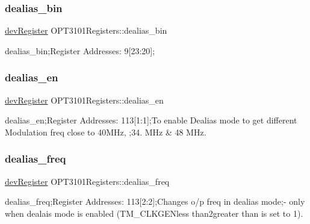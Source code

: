 \subsubsection{\texorpdfstring{dealias\+\_\+bin}{dealias\_bin}}
{\footnotesize\ttfamily \mbox{\hyperlink{classdev_register}{dev\+Register}} O\+P\+T3101\+Registers\+::dealias\+\_\+bin}



dealias\+\_\+bin;Register Addresses\+: 9\mbox{[}23\+:20\mbox{]}; 

\mbox{\label{class_o_p_t3101_registers_ac931eedf109f2f9401b66df4e3507a4b}} 
\subsubsection{\texorpdfstring{dealias\+\_\+en}{dealias\_en}}
{\footnotesize\ttfamily \mbox{\hyperlink{classdev_register}{dev\+Register}} O\+P\+T3101\+Registers\+::dealias\+\_\+en}



dealias\+\_\+en;Register Addresses\+: 113\mbox{[}1\+:1\mbox{]};To enable Dealias mode to get different Modulation freq close to 40\+M\+Hz, ;34. M\+Hz \& 48 M\+Hz. 

\mbox{\label{class_o_p_t3101_registers_a06fbd3557236e1c0b91d69f2a9d426aa}} 
\subsubsection{\texorpdfstring{dealias\+\_\+freq}{dealias\_freq}}
{\footnotesize\ttfamily \mbox{\hyperlink{classdev_register}{dev\+Register}} O\+P\+T3101\+Registers\+::dealias\+\_\+freq}



dealias\+\_\+freq;Register Addresses\+: 113\mbox{[}2\+:2\mbox{]};Changes o/p freq in dealias mode;-\/ only when dealais mode is enabled (T\+M\+\_\+\+C\+L\+K\+G\+E\+Nless than2greater than is set to \textquotesingle{}1\textquotesingle{}). 

\mbox{\label{class_o_p_t3101_registers_acd7195bc7b0e9f0ff1bef55b76209f61}} 
